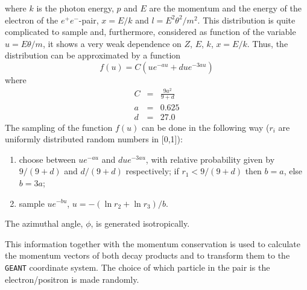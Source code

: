 where $k$ is the photon energy, $p$ and $E$  are the momentum and
the energy of the electron of the $e^+e^-$-pair,
$x=E/k$  and $l = E^{2} \theta^{2}/m^{2}$. This distribution
is quite complicated to sample and, furthermore, considered as
function of the variable
$u = E \theta/m$, it shows a very weak dependence on $Z$, $E$, $k$,
$x = E/k$. Thus, the distribution can be approximated by a function
\begin{equation}
f(u) = C \left( u e^{-au} + d u e^{-3au} \right)
\end{equation}
where
\begin{eqnarray*}
C & = & \frac{9a^{2}}{9 + d} \\
a & = & 0.625 \\
d & = & 27.0 
\end{eqnarray*}
The sampling of the function $f(u)$ can be done in the following way
($r_{i}$ are uniformly distributed random numbers
in [0,1]):
\begin{enumerate}
\item choose between $u e^{-au}$ and $d u e^{-3au}$, with relative
probability given by $9/(9+d)$ and $d/(9+d)$ respectively;
if $r_{1} < 9/(9+d)$ then $b=a$, else $b=3a$;
\item sample $u e^{-bu}$, $u=-(\ln r_{2} + \ln r_{3})/b$.
\end{enumerate}

The azimuthal angle, $\phi$, is generated isotropically.

This information together with the momentum conservation is used to calculate
the momentum vectors of both decay products and to transform
them to the {\tt GEANT} coordinate system.
The choice of which particle in the pair is the electron/positron is
made randomly.

